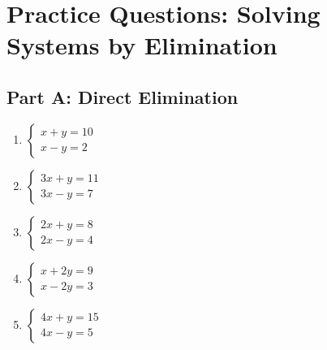 \documentclass[12pt]{article}
\begin{document}
\newpage


\section*{Practice Questions: Solving Systems by Elimination}

\subsection*{Part A: Direct Elimination}
\begin{enumerate}
    \item \(\begin{cases} x + y = 10 \\ x - y = 2 \end{cases}\)
    \item \(\begin{cases} 3x + y = 11 \\ 3x - y = 7 \end{cases}\)
    \item \(\begin{cases} 2x + y = 8 \\ 2x - y = 4 \end{cases}\)
    \item \(\begin{cases} x + 2y = 9 \\ x - 2y = 3 \end{cases}\)
    \item \(\begin{cases} 4x + y = 15 \\ 4x - y = 5 \end{cases}\)
\end{enumerate}
\end{document}
